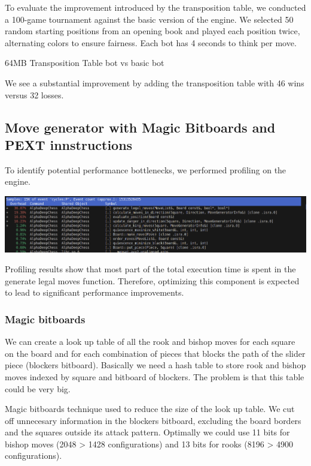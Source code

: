 To evaluate the improvement introduced by the transposition table, we conducted a 100-game tournament against the basic version of the engine. We selected 50 random starting positions from an opening book and played each position twice, alternating colors to ensure fairness. Each bot has 4 seconds to think per move.

\vspace{1em}

64MB Transposition Table bot vs basic bot\\
\medskip

\noindent We see a substantial improvement by adding the transposition table with 46 wins versus 32 losses.

\subsection{Move generator with Magic Bitboards and PEXT innstructions}

To identify potential performance bottlenecks, we performed profiling on the engine.

\begin{center}
    \includegraphics[width=1.0\textwidth]{Imagenes/basic_move_generator_profiling.png}
\end{center}

\noindent Profiling results show that most part of the total execution time is spent in the generate legal moves function. Therefore, optimizing this component is expected to lead to significant performance improvements.

\subsubsection{Magic bitboards}

We can create a look up table of all the rook and bishop moves for each square on the board and for each combination of pieces that blocks the path of the slider piece (blockers  bitboard). Basically we need a hash table to store rook and bishop moves indexed by square and bitboard of blockers. The problem is that this table could be very big.

\noindent Magic bitboards technique used to reduce the size of the look up table. We cut off unnecesary information in the blockers bitboard, excluding the board borders and the squares outside its attack pattern. Optimally we could use 11 bits for bishop moves (2048 > 1428 configurations) and 13 bits for rooks (8196 > 4900 configurations).


